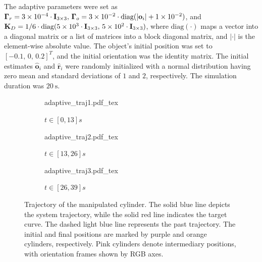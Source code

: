The adaptive parameters were set as $\boldsymbol{\Gamma}_r=\num{3E-4}\cdot\mathbf{I}_{3\times3},\, \boldsymbol{\Gamma}_o=\num{3E-2}\cdot\text{diag}(|\mathbf{o}_i| + \num{1E-2}) $, and $\mathbf{K}_D=1\slash6\cdot\text{diag}(\num{5E3}\cdot\mathbf{I}_{3\times3},\,\num{5E2}\cdot\mathbf{I}_{3\times3})$, where $\text{diag}(\cdot)$ maps a vector into a diagonal matrix or a list of matrices into a block diagonal matrix, and $|\cdot|$ is the element-wise absolute value. The object's initial position was set to $[-0.1,\, 0,\, 0.2]^T$, and the initial orientation was the identity matrix. The initial estimates $\hat{\mathbf{o}}_i$ and $\hat{\mathbf{r}}_i$ were randomly initialized with a normal distribution having zero mean and standard deviations of $1$ and $2$, respectively. The simulation duration was $\qty{20}{\second}$.
\begin{figure}[ht!]
    \centering
    \begin{subfigure}[b]{0.32\textwidth}
        \centering
        \def\svgwidth{\linewidth}
        {{adaptive_traj1.pdf_tex}}
        \caption{$t\in[0, 13]s$}
        \label{fig:adaptive-traj-first}
    \end{subfigure}
    \hfill
    \begin{subfigure}[b]{0.32\textwidth}
        \centering
        \def\svgwidth{\linewidth}
        {{adaptive_traj2.pdf_tex}}
        \caption{$t\in[13, 26]s$}
        \label{fig:adaptive-traj-second}
    \end{subfigure}
    \hfill
    \begin{subfigure}[b]{0.32\textwidth}
        \centering
        \def\svgwidth{\linewidth}
        {{adaptive_traj3.pdf_tex}}
        \caption{$t\in[26, 39]s$}
        \label{fig:adaptive-traj-third}
    \end{subfigure}
    \caption{Trajectory of the manipulated cylinder. The solid blue line depicts the system trajectory, while the solid red line indicates the target curve. The dashed light blue line represents the past trajectory. The initial and final positions are marked by purple and orange cylinders, respectively. Pink cylinders denote intermediary positions, with orientation frames shown by RGB axes.}
    \label{fig:adaptive-trajectory}
\end{figure}


